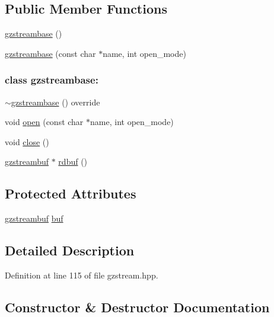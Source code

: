 \subsection*{Public Member Functions}
\begin{DoxyCompactItemize}
\item 
\hyperlink{classgzstreambase_af4d635149fd9d9e96cd5b803adeccc62}{gzstreambase} ()
\item 
\hyperlink{classgzstreambase_a258adf33ea797692dc3953f514da86de}{gzstreambase} (const char $\ast$name, int open\+\_\+mode)
\begin{DoxyCompactList}\small\item\em 

 \subsubsection*{class gzstreambase\+: }\end{DoxyCompactList}\item 
\hyperlink{classgzstreambase_ac2a032f99b3abddb9f60e1a6e9b56405}{$\sim$gzstreambase} () override
\item 
void \hyperlink{classgzstreambase_a88288f683ba4b4978aef1c460ff669c4}{open} (const char $\ast$name, int open\+\_\+mode)
\item 
void \hyperlink{classgzstreambase_aec08e42d554bbe919acd44eba0c40057}{close} ()
\item 
\hyperlink{classgzstreambuf}{gzstreambuf} $\ast$ \hyperlink{classgzstreambase_a85a5899a56d1ee9259d02083195471ba}{rdbuf} ()
\end{DoxyCompactItemize}
\subsection*{Protected Attributes}
\begin{DoxyCompactItemize}
\item 
\hyperlink{classgzstreambuf}{gzstreambuf} \hyperlink{classgzstreambase_a131e2a0d578c43cb4eb34d668bf75fdb}{buf}
\end{DoxyCompactItemize}


\subsection{Detailed Description}


Definition at line 115 of file gzstream.\+hpp.



\subsection{Constructor \& Destructor Documentation}
\mbox{\label{classgzstreambase_af4d635149fd9d9e96cd5b803adeccc62}} 
